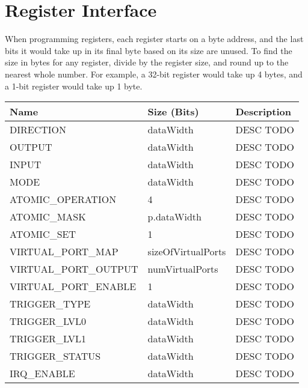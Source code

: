\section{Register Interface}
 
When programming registers, each register starts on a byte address, and the last bits it would take up in its final byte based on its size are unused. To find the size in bytes for any register, divide by the register size, and round up to the nearest whole number. For example, a 32-bit register would take up 4 bytes, and a 1-bit register would take up 1 byte.
 
\begin{longtable}[H]{
  | p{}
  | p{}
  | p{} |
  }
  \hline
  \textbf{Name} &   
  \textbf{Size (Bits)} &   
  \textbf{Description} \\ \hline \hline

  DIRECTION  &   
  dataWidth &   
  DESC TODO \\ \hline

  OUTPUT &   
  dataWidth &   
  DESC TODO \\ \hline

  INPUT &   
  dataWidth &   
  DESC TODO \\ \hline

  MODE &   
  dataWidth &   
  DESC TODO \\ \hline

  ATOMIC\_OPERATION &   
  4 &   
  DESC TODO \\ \hline

  ATOMIC\_MASK &   
  p.dataWidth &   
  DESC TODO \\ \hline

  ATOMIC\_SET &   
  1 &   
  DESC TODO \\ \hline

  VIRTUAL\_PORT\_MAP &   
  sizeOfVirtualPorts &   
  DESC TODO \\ \hline

  VIRTUAL\_PORT\_OUTPUT &   
  numVirtualPorts &   
  DESC TODO \\ \hline

  VIRTUAL\_PORT\_ENABLE &   
  1 &   
  DESC TODO \\ \hline

  TRIGGER\_TYPE &   
  dataWidth &   
  DESC TODO \\ \hline
  
  TRIGGER\_LVL0 &   
  dataWidth &   
  DESC TODO \\ \hline
  
  TRIGGER\_LVL1 &   
  dataWidth &   
  DESC TODO \\ \hline
  
  TRIGGER\_STATUS &   
  dataWidth &   
  DESC TODO \\ \hline
  
  IRQ\_ENABLE &   
  dataWidth &   
  DESC TODO \\ \hline

\end{longtable}
